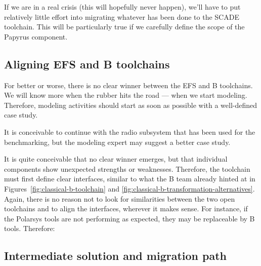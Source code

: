 

If we are in a real crisis (this will hopefully never happen), we'll have to put relatively little effort into migrating whatever has been done to the SCADE toolchain.  This will be particularly true if we carefully define the scope of the Papyrus component.


\subsection{Aligning EFS and B toolchains}

For better or worse, there is no clear winner between the EFS and B toolchains.  We will know more when the rubber hits the road --- when we start modeling.  Therefore, modeling activities should start as soon as possible with a well-defined case study.


It is conceivable to continue with the radio subsystem that has been used for the benchmarking, but the modeling expert may suggest a better case study.

It is quite conceivable that no clear winner emerges, but that individual components show unexpected strengths or weaknesses.  Therefore, the toolchain must first define clear interfaces, similar to what the B team already hinted at in Figures~\ref{fig:classical-b-toolchain} and \ref{fig:classical-b-transformation-alternatives}.  Again, there is no reason not to look for similarities between the two open toolchains and to align the interfaces, wherever it makes sense.  For instance, if the Polarsys tools are not performing as expected, they may be replaceable by B tools.  Therefore:


\subsection{Intermediate solution and migration path}

